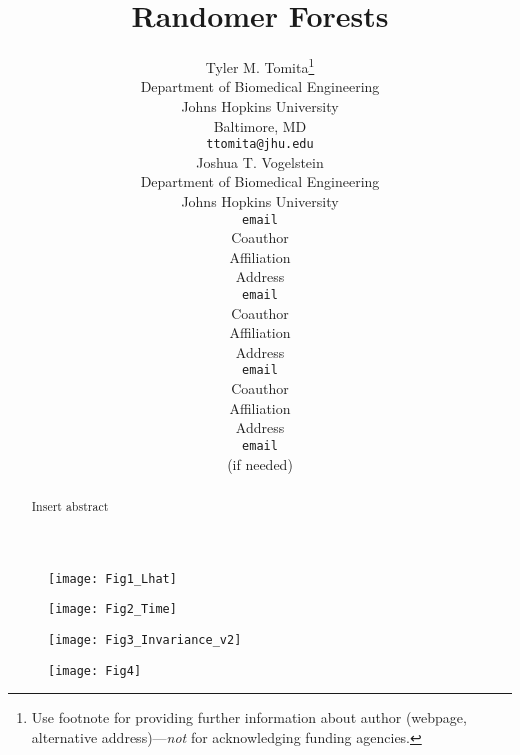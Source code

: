 \documentclass{article} %
\title{Randomer Forests}
\author{
Tyler M. Tomita\thanks{ Use footnote for providing further information
about author (webpage, alternative address)---\emph{not} for acknowledging
funding agencies.} \\
Department of Biomedical Engineering\\
Johns Hopkins University\\
Baltimore, MD \\
\texttt{ttomita@jhu.edu} \\
\And
Joshua T. Vogelstein \\
Department of Biomedical Engineering \\
Johns Hopkins University \\
\texttt{email} \\
\AND
Coauthor \\
Affiliation \\
Address \\
\texttt{email} \\
\And
Coauthor \\
Affiliation \\
Address \\
\texttt{email} \\
\And
Coauthor \\
Affiliation \\
Address \\
\texttt{email} \\
(if needed)\\
}
\begin{document}
\maketitle

\begin{abstract}
Insert abstract
\end{abstract}


\begin{figure}[h]
\begin{center}
\texttt{[image: Fig1\_Lhat]}
\end{center}
\caption{}
\end{figure}

\begin{figure}[h]
\begin{center}
\texttt{[image: Fig2\_Time]}
\end{center}
\caption{}
\end{figure}

\begin{figure}[h]
\begin{center}
\texttt{[image: Fig3\_Invariance\_v2]}
\end{center}
\caption{}
\end{figure}

\begin{figure}[h]
\begin{center}
\texttt{[image: Fig4]}
\end{center}
\caption{}
\end{figure}
\end{document}
